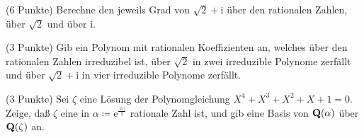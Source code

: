 \documentclass{algsheet}
\begin{document}
\begin{exercise}(6 Punkte)\newline
    Berechne den jeweils Grad von \(\sqrt 2 + \mathrm i\) über den rationalen
    Zahlen, über \(\sqrt 2\) und über \(\mathrm i\).
\end{exercise}

\begin{exercise}(3 Punkte)\newline
    Gib ein Polynom mit rationalen Koeffizienten an, welches über den rationalen
    Zahlen irreduzibel ist, über \(\sqrt 2\) in zwei irreduzible Polynome zerfällt und
    über \(\sqrt 2 + \mathrm i\) in vier irreduzible Polynome zerfällt.
\end{exercise}  

\begin{exercise}(3 Punkte)\newline
    Sei \(\zeta\) eine Lösung der Polynomgleichung \(X^4 + X^3 + X^2 + X + 1 = 0\). 
    Zeige, daß \(\zeta\) eine in \(\alpha \coloneqq \mathrm e^{\frac{\uppi \mathrm i}{5}}\)
    rationale Zahl ist, und gib eine Basis von \(\mathbf Q(\alpha)\) über
    \(\mathbf Q(\zeta)\) an.
\end{exercise}
\end{document}
